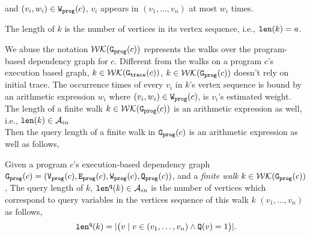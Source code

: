 {\begin{defn}
\begin{itemize}
    and $(v_i, w_i) \in \mathtt{{W_{prog}}}(c)$, 
      $v_i$ appears in $(v_1, \ldots, v_{n})$ at most 
  $w_i$
    times.  
\end{itemize}
%
The length of $k$ is the number of vertices in its vertex sequence, i.e., $\mathtt{len}(k) = a$.
\end{defn}
We abuse the notation $\mathcal{WK}(\mathtt{{G_{prog}}}(c))$ represents the walks over the program-based dependency graph for $c$.
Different from the walks on a program $c$'s execution based graph,
$k \in \mathcal{WK}(\mathtt{{G_{trace}}}(c))$, 
$k \in \mathcal{WK}(\mathtt{{G_{prog}}}(c))$ doesn't rely on initial trace.
The occurrence times of every $v_i $ in $k$'s vertex sequence is bound by 
an arithmetic expression $w_i$ where $(v_i, w_i) \in \mathtt{{W_{prog}}}(c)$, is $v_i$'s estimated weight. 
The length of a finite walk $k \in \mathcal{WK}(\mathtt{{G_{prog}}}(c))$ is an arithmetic expression
as well, i.e., $\mathtt{len}(k) \in \mathcal{A}_{in}$
\\
Then the query length of a finite walk in  $\mathtt{{G_{prog}}}(c)$ is an arithmetic expression as well as follows,
\begin{defn}
\label{def:static-qlen}
Given 
a program $c$'s execution-based dependency graph 
$\mathtt{{G_{prog}}}({c}) = (\mathtt{{V_{prog}}}(c), \mathtt{{E_{prog}}}(c), \mathtt{{W_{prog}}}(c), \mathtt{{Q_{prog}}}(c))$, 
  and a \emph{finite walk} $k \in \mathcal{WK}(\mathtt{{G_{prog}}}(c))$,
The query length of $k$, $\mathtt{len}^{\tt q}(k) \in \mathcal{A}_{in}$ 
is the number of vertices which correspond to query variables in the vertices sequence of this walk $k$
$(v_1, \ldots, v_{n})$ as follows, 
\[
  \mathtt{len}^{\tt q}(k) = |\big( v \mid v \in (v_1, \ldots, v_{n}) \land \mathtt{Q}(v) = 1 \big)|.
\]

\end{defn}}
